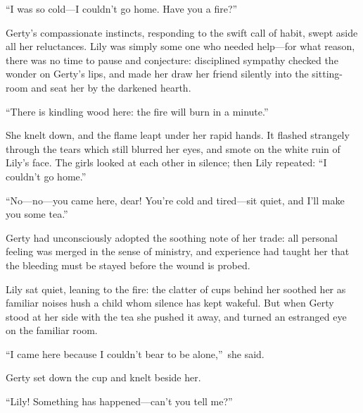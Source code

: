 \documentclass[12pt,a4paper]{book}
\begin{document}
``I was so cold---I couldn't go home. Have you a fire?''





Gerty's compassionate instincts, responding to the swift call of
habit, swept aside all her reluctances. Lily was simply some one
who needed help---for what reason, there was no time to pause and
conjecture: disciplined sympathy checked the wonder on Gerty's
lips, and made her draw her friend silently into the sitting-room
and seat her by the darkened hearth.





``There is kindling wood here: the fire will burn in a minute.''





She knelt down, and the flame leapt under her rapid hands. It
flashed strangely through the tears which still blurred her eyes,
and smote on the white ruin of Lily's face. The girls looked at
each other in silence; then Lily repeated: ``I couldn't go home.''





``No---no---you came here, dear! You're cold and tired---sit quiet,
and I'll make you some tea.''





Gerty had unconsciously adopted the soothing note of her trade: 
all personal feeling was merged in the sense of ministry, and
experience had taught her that the bleeding must be stayed before
the wound is probed.





Lily sat quiet, leaning to the fire: the clatter of cups behind
her soothed her as familiar noises hush a child whom silence has
kept wakeful. But when Gerty stood at her side with the tea she
pushed it away, and turned an estranged eye on the familiar room.





``I came here because I couldn't bear to be alone,''\ she said.





Gerty set down the cup and knelt beside her.





``Lily! Something has happened---can't you tell me?''
\end{document}
